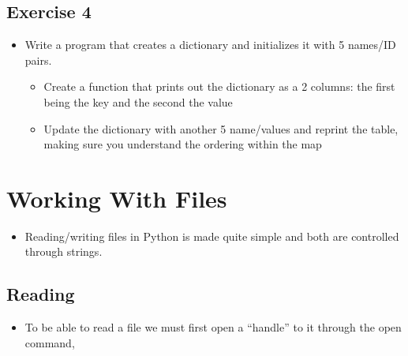 \documentclass[letterpaper,10pt,english,openany]{sphinxmanual}
\begin{document}
\subsection{Exercise 4}
\label{\detokenize{introduction_to_python/basic_python_exercises_3-4:exercise-4}}\begin{itemize}
\item {} 
Write a program that creates a dictionary and initializes it with 5
names/ID pairs.
\begin{itemize}
\item {} 
Create a function that prints out the dictionary as a 2 columns:
the first being the key and the second the value

\item {} 
Update the dictionary with another 5 name/values and reprint the
table, making sure you understand the ordering within the map

\end{itemize}

\end{itemize}


\section{Working With Files}
\label{\detokenize{introduction_to_python/working_with_files:working-with-files}}\label{\detokenize{introduction_to_python/working_with_files:id1}}\label{\detokenize{introduction_to_python/working_with_files::doc}}\begin{itemize}
\item {} 
Reading/writing files in Python is made quite simple and both are
controlled through strings.

\end{itemize}


\subsection{Reading}
\label{\detokenize{introduction_to_python/working_with_files:reading}}\begin{itemize}
\item {} 
To be able to read a file we must first open a “handle” to it through
the open command,

\end{itemize}
\end{document}
